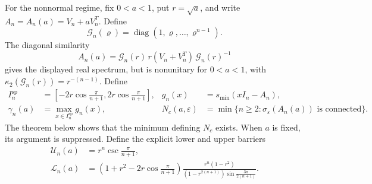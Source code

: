 \documentclass[10pt,twoside]{siamart1116}
\numberwithin{equation}{section}
\DeclareMathOperator{\diag}{diag}
\begin{document}
For the nonnormal regime, fix
\(0<a<1\), put \(r=\sqrt a\), and write
\(A_n=A_n(a)=V_n+aV_n^T\).  Define
\[
 \mathcal G_n(\varrho)=\diag(1,\varrho,\ldots,\varrho^{n-1}).
\]
The diagonal similarity
\begin{equation}\label{eq:intro-similarity}
 A_n(a)=\mathcal G_n(r)\,r(V_n+V_n^T)\,\mathcal G_n(r)^{-1}
\end{equation}
gives the displayed real spectrum, but is nonunitary for \(0<a<1\), with
\(\kappa_2(\mathcal G_n(r))=r^{-(n-1)}\).
Define
\[
 \begin{aligned}
 I_n^{\mathrm{sp}}
 &=\left[-2r\cos\frac{\pi}{n+1},2r\cos\frac{\pi}{n+1}\right],
 &g_n(x)&=s_{\min}(xI_n-A_n),\\
 \gamma_n(a)&=\max_{x\in I_n^{\mathrm{sp}}}g_n(x),
 &N_c(a,\varepsilon)&=\min\{n\geq2:
 \sigma_\varepsilon(A_n(a))\text{ is connected}\}.
 \end{aligned}
\]
The theorem below shows that the minimum defining \(N_c\) exists.  When
\(a\) is fixed, its argument is suppressed.  Define the explicit lower and
upper barriers
\begin{align}
 \mathcal U_n(a)&=r^n\csc\frac{\pi}{n+1},\label{eq:main-U-def}\\
 \mathcal L_n(a)&=
 \left(1+r^2-2r\cos\frac{\pi}{n+1}\right)
 \frac{r^n(1-r^2)}
 {(1-r^{2(n+1)})\sin\frac{3\pi}{2(n+1)}}.\label{eq:main-L-def}
\end{align}
\end{document}
